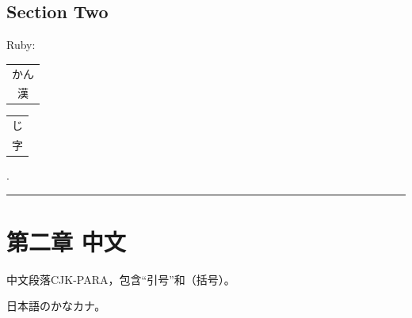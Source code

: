 \documentclass[11pt,openany,oneside]{book}
\makeatletter
\newcommand\erruby[2]{\leavevmode\begin{tabular}[b]{@{}c@{}}{\tiny #2}\\[-0.4ex]#1\end{tabular}}
\makeatother
\begin{document}
\section*{Section Two}
Ruby: \erruby{漢}{かん}\erruby{字}{じ}.

{\centering \rule{2pt}{2pt}\par}


\clearpage{}
{}
\chapter*{第二章 中文}
\leavevmode\hypertarget{d2.target}{}中文段落CJK-PARA，包含“引号”和（括号）。

日本語のかなカナ。
\end{document}
